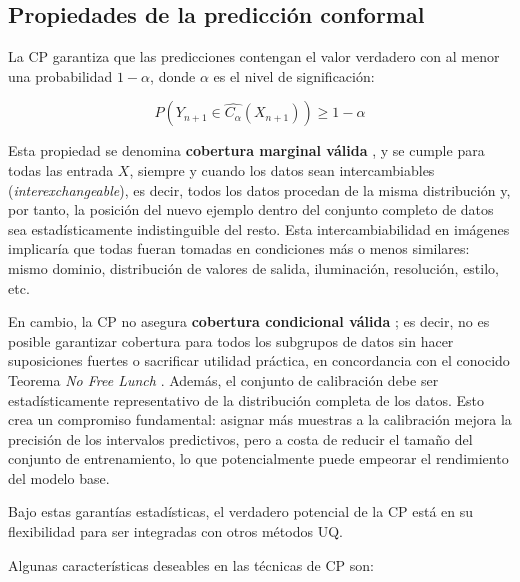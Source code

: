 
\subsection{Propiedades de la predicción conformal}

La CP garantiza que las predicciones contengan el valor verdadero con al menor una probabilidad $1-\alpha$, 
donde $\alpha$ es el nivel de significación:

$$
P(Y_{n+1} \in \hat{C_\alpha}(X_{n+1})) \ge 1 - \alpha
$$

Esta propiedad se denomina \textbf{cobertura marginal válida} \cite{prinster2024}, y se cumple para todas las 
entrada $X$, siempre y cuando los datos sean intercambiables (\textit{interexchangeable}), es decir, todos los 
datos procedan de la misma distribución y, por tanto, la posición del nuevo ejemplo dentro del conjunto 
completo de datos sea estadísticamente indistinguible del resto. Esta intercambiabilidad en imágenes 
implicaría que todas fueran tomadas en condiciones más o menos similares: mismo dominio, distribución de 
valores de salida, iluminación, resolución, estilo, etc.

En cambio, la CP no asegura \textbf{cobertura condicional válida} \cite{foygel2021}; es decir, no es posible 
garantizar cobertura para todos los subgrupos de datos sin hacer suposiciones fuertes o sacrificar utilidad 
práctica, en concordancia con el conocido Teorema \textit{No Free Lunch} \cite{wolpert1997}. 
Además, el conjunto de calibración debe ser estadísticamente representativo de la distribución completa de los 
datos. Esto crea un compromiso fundamental: asignar más muestras a la calibración mejora la precisión de los 
intervalos predictivos, pero a costa de reducir el tamaño del conjunto de entrenamiento, lo que potencialmente 
puede empeorar el rendimiento del modelo base.

Bajo estas garantías estadísticas, el verdadero potencial de la CP está en su flexibilidad para ser 
integradas con otros métodos UQ.

Algunas características deseables en las técnicas de CP son:


